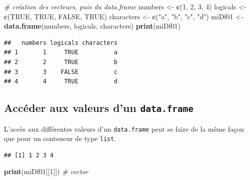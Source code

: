 \documentclass[twoside,symmetric]{book}
\newenvironment{Shaded}{}{}
\newcommand{\CommentTok}[1]{\textit{#1}}
\newcommand{\DecValTok}[1]{#1}
\newcommand{\KeywordTok}[1]{\textbf{#1}}
\newcommand{\NormalTok}[1]{#1}
\newcommand{\OperatorTok}[1]{#1}
\newcommand{\OtherTok}[1]{#1}
\newcommand{\StringTok}[1]{#1}
\begin{document}
\begin{Shaded}
\begin{Highlighting}[]
\CommentTok{# création des vecteurs, puis du data.frame}
\NormalTok{numbers <-}\StringTok{ }\KeywordTok{c}\NormalTok{(}\DecValTok{1}\NormalTok{, }\DecValTok{2}\NormalTok{, }\DecValTok{3}\NormalTok{, }\DecValTok{4}\NormalTok{)}
\NormalTok{logicals <-}\StringTok{ }\KeywordTok{c}\NormalTok{(}\OtherTok{TRUE}\NormalTok{, }\OtherTok{TRUE}\NormalTok{, }\OtherTok{FALSE}\NormalTok{, }\OtherTok{TRUE}\NormalTok{)}
\NormalTok{characters <-}\StringTok{ }\KeywordTok{c}\NormalTok{(}\StringTok{"a"}\NormalTok{, }\StringTok{"b"}\NormalTok{, }\StringTok{"c"}\NormalTok{, }\StringTok{"d"}\NormalTok{)}
\NormalTok{miDf01 <-}\StringTok{ }\KeywordTok{data.frame}\NormalTok{(numbers, logicals, characters)}
\KeywordTok{print}\NormalTok{(miDf01)}
\end{Highlighting}
\end{Shaded}

\begin{verbatim}
##   numbers logicals characters
## 1       1     TRUE          a
## 2       2     TRUE          b
## 3       3    FALSE          c
## 4       4     TRUE          d
\end{verbatim}

\hypertarget{accuxe9der-aux-valeurs-dun-data.frame}{%
\subsection{\texorpdfstring{Accéder aux valeurs d'un \texttt{data.frame}}{Accéder aux valeurs d'un data.frame}}\label{accuxe9der-aux-valeurs-dun-data.frame}}

L'accès aux différentes valeurs d'un \texttt{data.frame} peut se faire de la même façon que pour un conteneur de type \texttt{list}.

\begin{Shaded}
\end{Shaded}

\begin{verbatim}
## [1] 1 2 3 4
\end{verbatim}

\begin{Shaded}
\begin{Highlighting}[]
\KeywordTok{print}\NormalTok{(miDf01[[}\DecValTok{1}\NormalTok{]]) }\CommentTok{# vector}
\end{Highlighting}
\end{Shaded}
\end{document}
